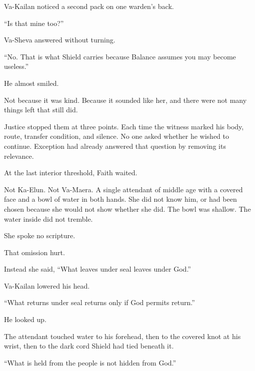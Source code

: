 Va-Kailan noticed a second pack on one warden’s back.\par

“Is that mine too?”\par

Va-Sheva answered without turning.\par

“No. That is what Shield carries because Balance assumes you may become useless.”\par

He almost smiled.\par

Not because it was kind. Because it sounded like her, and there were not many things left that still did.\par

Justice stopped them at three points. Each time the witness marked his body, route, transfer condition, and silence. No one asked whether he wished to continue. Exception had already answered that question by removing its relevance.\par

At the last interior threshold, Faith waited.\par

Not Ka-Elun. Not Va-Maera. A single attendant of middle age with a covered face and a bowl of water in both hands. She did not know him, or had been chosen because she would not show whether she did. The bowl was shallow. The water inside did not tremble.\par

She spoke no scripture.\par

That omission hurt.\par

Instead she said, “What leaves under seal leaves under God.”\par

Va-Kailan lowered his head.\par

“What returns under seal returns only if God permits return.”\par

He looked up.\par

The attendant touched water to his forehead, then to the covered knot at his wrist, then to the dark cord Shield had tied beneath it.\par

“What is held from the people is not hidden from God.”\par

